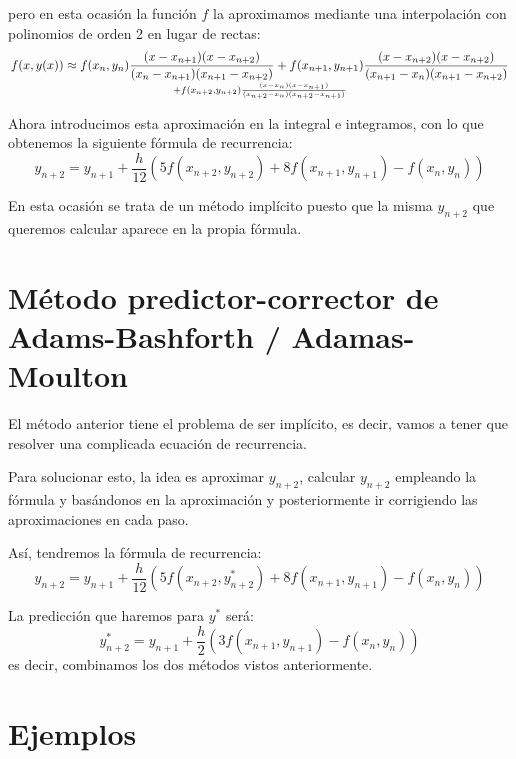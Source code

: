 \documentclass{apuntes}
\begin{document}
pero en esta ocasión la función $f$ la aproximamos mediante una interpolación con polinomios de orden 2 en lugar de rectas:
\[f(x,y(x)) \approx f(x_n,y_n) \frac{(x-x_{n+1})(x-x_{n+2})}{(x_n-x_{n+1})(x_{n+1}-x_{n+2})} + f(x_{n+1},y_{n+1})\frac{(x-x_{n+2})(x-x_{n+2})}{(x_{n+1}-x_n)(x_{n+1}-x_{n+2})} \atop+f(x_{n+2},y_{n+2})\frac{(x-x_{n})(x-x_{n+1})}{(x_{n+2}-x_n)(x_{n+2}-x_{n+1})}\]

Ahora introducimos esta aproximación en la integral e integramos, con lo que obtenemos la siguiente fórmula de recurrencia:
\[y_{n+2} = y_{n+1} + \frac{h}{12}\left( 5f(x_{n+2},y_{n+2})+8f(x_{n+1},y_{n+1})-f(x_n,y_n)\right)\]

En esta ocasión se trata de un método implícito puesto que la misma $y_{n+2}$ que queremos calcular aparece en la propia fórmula.

\section{Método predictor-corrector de Adams-Bashforth / Adamas-Moulton}

El método anterior tiene el problema de ser implícito, es decir, vamos a tener que resolver una complicada ecuación de recurrencia.

Para solucionar esto, la idea es aproximar $y_{n+2}$, calcular $y_{n+2}$ empleando la fórmula y basándonos en la aproximación y posteriormente ir corrigiendo las aproximaciones en cada paso.

Así, tendremos la fórmula de recurrencia:
\[y_{n+2} = y_{n+1} + \frac{h}{12}\left( 5f(x_{n+2},y_{n+2}^*)+8f(x_{n+1},y_{n+1})-f(x_n,y_n)\right)\]

La predicción que haremos para $y^*$ será:
\[y_{n+2}^* = y_{n+1} + \frac{h}{2} \left( 3f(x_{n+1},y_{n+1})-f(x_n,y_n)\right)\]
es decir, combinamos los dos métodos vistos anteriormente.

\section{Ejemplos}
\end{document}

